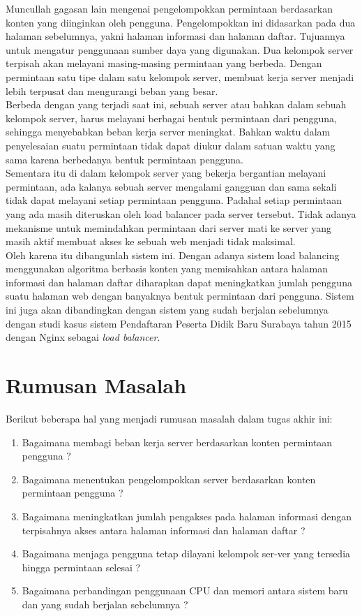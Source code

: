 \documentclass{ta-its}
\begin{document}
			\indent Muncullah gagasan lain mengenai pengelompokkan permintaan berdasarkan konten yang diinginkan oleh pengguna. Pengelompokkan ini didasarkan pada dua halaman sebelumnya, yakni halaman informasi dan halaman daftar. Tujuannya untuk mengatur penggunaan sumber daya yang digunakan. Dua kelompok server terpisah akan melayani masing-masing permintaan yang berbeda. Dengan permintaan satu tipe dalam satu kelompok server, membuat kerja server menjadi lebih terpusat dan mengurangi beban yang besar. \\
			\indent Berbeda dengan yang terjadi saat ini, sebuah server atau bahkan dalam sebuah kelompok server, harus melayani berbagai bentuk permintaan dari pengguna, sehingga menyebabkan beban kerja server meningkat. Bahkan waktu dalam penyelesaian suatu permintaan tidak dapat diukur dalam satuan waktu yang sama karena berbedanya bentuk permintaan pengguna. \\
			\indent Sementara itu di dalam kelompok server yang bekerja bergantian melayani permintaan, ada kalanya sebuah server mengalami gangguan dan sama sekali tidak dapat melayani setiap permintaan pengguna. Padahal setiap permintaan yang ada masih diteruskan oleh load balancer pada server tersebut. Tidak adanya mekanisme untuk memindahkan permintaan dari server mati ke server yang masih aktif membuat akses ke sebuah web menjadi tidak maksimal. \\
			\indent Oleh karena itu dibangunlah sistem ini. Dengan adanya sistem load balancing menggunakan algoritma berbasis konten yang memisahkan antara halaman informasi dan halaman daftar diharapkan dapat meningkatkan jumlah pengguna suatu halaman web dengan banyaknya bentuk permintaan dari pengguna. Sistem ini juga akan dibandingkan dengan sistem yang sudah berjalan sebelumnya dengan studi kasus sistem Pendaftaran Peserta Didik Baru Surabaya tahun 2015 dengan Nginx sebagai \textit{load balancer}.

            
        \section{Rumusan Masalah}
			Berikut beberapa hal yang menjadi rumusan masalah dalam tugas akhir ini:
			\begin{enumerate}
			\item Bagaimana membagi beban kerja server berdasarkan konten permintaan pengguna ?
			\item Bagaimana menentukan pengelompokkan server berdasarkan konten permintaan pengguna ?
			\item Bagaimana meningkatkan jumlah pengakses pada halaman informasi dengan terpisahnya akses antara halaman informasi dan halaman daftar ?
			\item Bagaimana menjaga pengguna tetap dilayani kelompok ser-ver yang tersedia hingga permintaan selesai ?
			\item Bagaimana perbandingan penggunaan CPU dan memori antara sistem baru dan yang sudah berjalan sebelumnya ?
			\end{enumerate}
\end{document}
